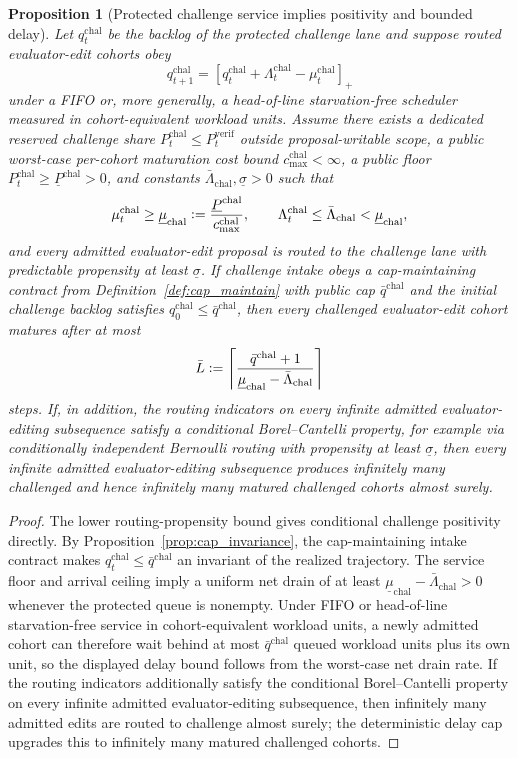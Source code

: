 \documentclass[11pt]{article}
\newtheorem{proposition}[theorem]{Proposition}
\theoremstyle{definition}
\newcommand{\1}{\mathbf{1}}
\newcommand{\Defeq}{\vcentcolon=}
\begin{document}
\begin{proposition}[Protected challenge service implies positivity and bounded delay]\label{prop:challenge_positivity}
Let $q_t^{\mathrm{chal}}$ be the backlog of the protected challenge lane and suppose routed evaluator-edit cohorts obey
\[
q_{t+1}^{\mathrm{chal}} = [q_t^{\mathrm{chal}} + \Lambda_t^{\mathrm{chal}} - \mu_t^{\mathrm{chal}}]_+
\]
under a FIFO or, more generally, a head-of-line starvation-free scheduler measured in cohort-equivalent workload units. Assume there exists a dedicated reserved challenge share $P_t^{\mathrm{chal}}\le P_t^{\mathrm{verif}}$ outside proposal-writable scope, a public worst-case per-cohort maturation cost bound $c_{\max}^{\mathrm{chal}}<\infty$, a public floor $P_t^{\mathrm{chal}}\ge \underline P^{\mathrm{chal}}>0$, and constants $\bar\Lambda_{\mathrm{chal}},\underline\sigma>0$ such that
\[
\mu_t^{\mathrm{chal}}\ge \underline\mu_{\mathrm{chal}}\Defeq \frac{\underline P^{\mathrm{chal}}}{c_{\max}^{\mathrm{chal}}},
\qquad
\Lambda_t^{\mathrm{chal}}\le \bar\Lambda_{\mathrm{chal}}<\underline\mu_{\mathrm{chal}},
\]
and every admitted evaluator-edit proposal is routed to the challenge lane with predictable propensity at least $\underline\sigma$. If challenge intake obeys a cap-maintaining contract from Definition~\ref{def:cap_maintain} with public cap $\bar q^{\mathrm{chal}}$ and the initial challenge backlog satisfies $q_0^{\mathrm{chal}}\le \bar q^{\mathrm{chal}}$, then every challenged evaluator-edit cohort matures after at most
\[
\bar L \Defeq \left\lceil \frac{\bar q^{\mathrm{chal}}+1}{\underline\mu_{\mathrm{chal}}-\bar\Lambda_{\mathrm{chal}}} \right\rceil
\]
steps. If, in addition, the routing indicators on every infinite admitted evaluator-editing subsequence satisfy a conditional Borel--Cantelli property, for example via conditionally independent Bernoulli routing with propensity at least $\underline\sigma$, then every infinite admitted evaluator-editing subsequence produces infinitely many challenged and hence infinitely many matured challenged cohorts almost surely.
\end{proposition}

\begin{proof}
The lower routing-propensity bound gives conditional challenge positivity directly. By Proposition~\ref{prop:cap_invariance}, the cap-maintaining intake contract makes $q_t^{\mathrm{chal}}\le \bar q^{\mathrm{chal}}$ an invariant of the realized trajectory. The service floor and arrival ceiling imply a uniform net drain of at least $\underline\mu_{\mathrm{chal}}-\bar\Lambda_{\mathrm{chal}}>0$ whenever the protected queue is nonempty. Under FIFO or head-of-line starvation-free service in cohort-equivalent workload units, a newly admitted cohort can therefore wait behind at most $\bar q^{\mathrm{chal}}$ queued workload units plus its own unit, so the displayed delay bound follows from the worst-case net drain rate. If the routing indicators additionally satisfy the conditional Borel--Cantelli property on every infinite admitted evaluator-editing subsequence, then infinitely many admitted edits are routed to challenge almost surely; the deterministic delay cap upgrades this to infinitely many matured challenged cohorts.
\end{proof}
\end{document}
